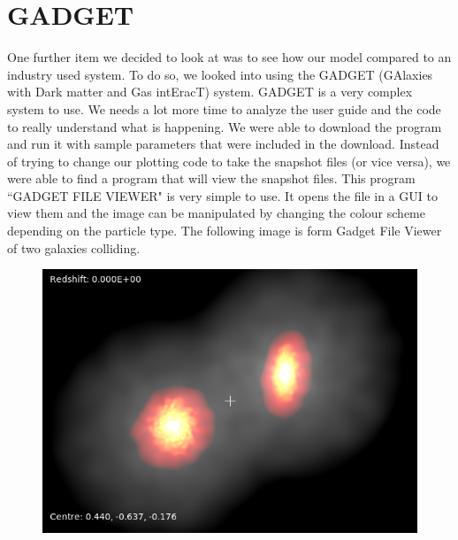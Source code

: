\documentclass[10pt]{article}
\begin{document}
\section{GADGET}
	One further item we decided to look at was to see how our model compared to an industry used system. To do so, we looked into using the GADGET (GAlaxies with Dark matter and Gas intEracT) system.
	GADGET is a very complex system to use. We needs a lot more time to analyze the user guide and the code to really understand what is happening. We were able to download the program and run it with sample parameters that were included in the download. Instead of trying to change our plotting code to take the snapshot files (or vice versa), we were able to find a program that will view the snapshot files. This program ``GADGET FILE VIEWER" is very simple to use. It opens the file in a GUI to view them and the image can be manipulated by changing the colour scheme depending on the particle type. The following image is form Gadget File Viewer of two galaxies colliding.

\begin{figure}[h]
\includegraphics[width=4.5in]{gadget.png}
\centering
\end{figure}
\end{document}
